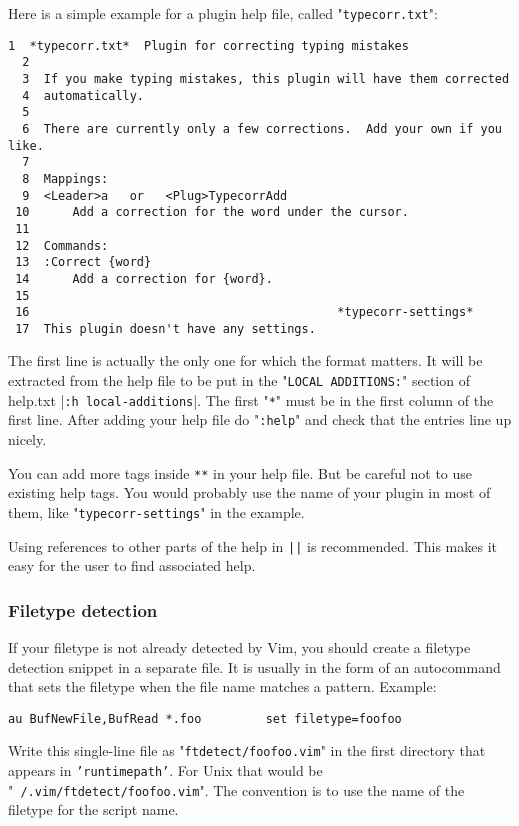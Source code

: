 Here is a simple example for a plugin help file, called "\texttt{typecorr.txt}":

\begin{Verbatim}[samepage=true]
  1  *typecorr.txt*  Plugin for correcting typing mistakes
  2
  3  If you make typing mistakes, this plugin will have them corrected
  4  automatically.
  5
  6  There are currently only a few corrections.  Add your own if you like.
  7
  8  Mappings:
  9  <Leader>a   or   <Plug>TypecorrAdd
 10      Add a correction for the word under the cursor.
 11
 12  Commands:
 13  :Correct {word}
 14      Add a correction for {word}.
 15
 16                                           *typecorr-settings*
 17  This plugin doesn't have any settings.
\end{Verbatim}

The first line is actually the only one for which the format matters.
It will be extracted from the help file to be put in the "\texttt{LOCAL ADDITIONS:}" section of help.txt |\texttt{:h local-additions}|.
The first "\texttt{*}" must be in the first column of the first line.
After adding your help file do "\texttt{:help}" and check that the entries line up nicely.

You can add more tags inside \texttt{**} in your help file.
But be careful not to use existing help tags.
You would probably use the name of your plugin in most of them, like "\texttt{typecorr-settings}" in the example.

Using references to other parts of the help in \texttt{||} is recommended.
This makes it easy for the user to find associated help.
\subsubsection{Filetype detection}
\label{plugin-filetype}
If your filetype is not already detected by Vim, you should create a filetype detection snippet in a separate file.
It is usually in the form of an autocommand that sets the filetype when the file name matches a pattern.
Example:

\begin{Verbatim}[samepage=true]
 au BufNewFile,BufRead *.foo         set filetype=foofoo
\end{Verbatim}

Write this single-line file as "\texttt{ftdetect/foofoo.vim}" in the first directory that appears in \texttt{'runtimepath'}.
For Unix that would be "\texttt{~/.vim/ftdetect/foofoo.vim}".
The convention is to use the name of the filetype for the script name.

